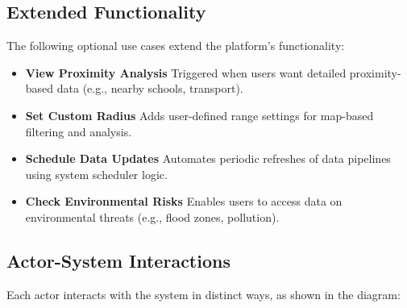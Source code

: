 \subsection{Extended Functionality}

The following optional use cases extend the platform’s functionality:

\begin{itemize}
	\item \textbf{View Proximity Analysis}  
	      Triggered when users want detailed proximity-based data (e.g., nearby schools, transport).
	      
	\item \textbf{Set Custom Radius}  
	      Adds user-defined range settings for map-based filtering and analysis.
	      
	\item \textbf{Schedule Data Updates}  
	      Automates periodic refreshes of data pipelines using system scheduler logic.
	      
	\item \textbf{Check Environmental Risks}  
	      Enables users to access data on environmental threats (e.g., flood zones, pollution).
\end{itemize}

\subsection{Actor-System Interactions}

Each actor interacts with the system in distinct ways, as shown in the diagram:

